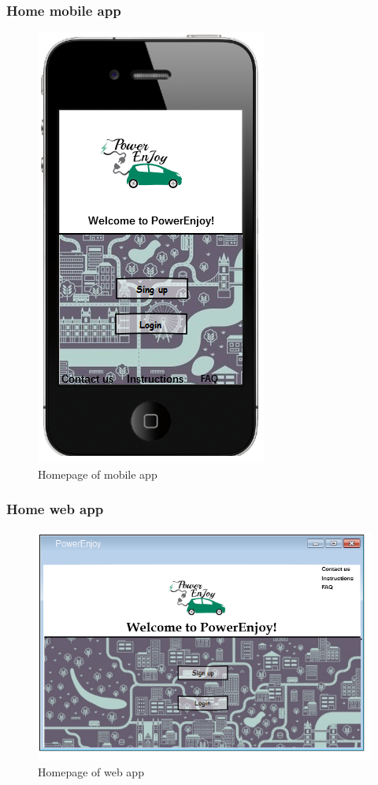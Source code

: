 \subsubsection{Home mobile app}
\begin{figure}[H]
\centering
\includegraphics[]{../images/mookup/Homepage_mobile}
\caption{Homepage of mobile app}
\end{figure}

\clearpage
\subsubsection{Home web app}
\begin{figure}[H]
\centering
\includegraphics[]{../images/mookup/homepage_web}
\caption{Homepage of web app}
\end{figure}

